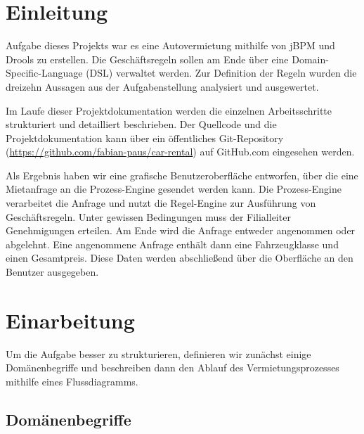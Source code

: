 



\setcounter{secnumdepth}{3}
\setcounter{tocdepth}{2}

\pagestyle{empty}


\tableofcontents
\setcounter{page}{1}

\pagestyle{scrheadings}

\newpage

\section{Einleitung}

Aufgabe dieses Projekts war es eine Autovermietung mithilfe von jBPM und Drools zu erstellen. Die Geschäftsregeln sollen am Ende über eine Domain-Specific-Language (DSL) verwaltet werden. Zur Definition der Regeln wurden die dreizehn Aussagen aus der Aufgabenstellung analysiert und ausgewertet. 

Im Laufe dieser Projektdokumentation werden die einzelnen Arbeitsschritte strukturiert und detailliert beschrieben. Der Quellcode und die Projektdokumentation kann über ein öffentliches Git-Repository (\url{https://github.com/fabian-paus/car-rental}) auf GitHub.com eingesehen werden. 

Als Ergebnis haben wir eine grafische Benutzeroberfläche entworfen, über die eine Miet\-anfrage an die Prozess-Engine gesendet werden kann. Die Prozess-Engine verarbeitet die Anfrage und nutzt die Regel-Engine zur Ausführung von Geschäftsregeln.
Unter gewissen Bedingungen muss der Filialleiter Genehmigungen erteilen.
Am Ende wird die Anfrage entweder angenommen oder abgelehnt. Eine angenommene Anfrage enthält dann eine Fahrzeugklasse und einen Gesamtpreis. Diese Daten werden abschließend über die Oberfläche an den Benutzer ausgegeben. 

\section{Einarbeitung}

Um die Aufgabe besser zu strukturieren, definieren wir zunächst einige Domänenbegriffe und 
beschreiben dann den Ablauf des Vermietungsprozesses mithilfe eines Flussdiagramms.

\subsection{Domänenbegriffe}

